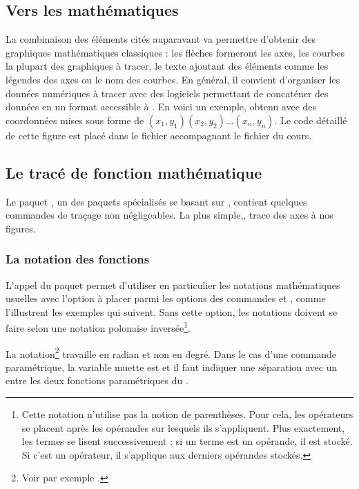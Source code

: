 \subsection{Vers les mathématiques}

La combinaison des éléments cités auparavant va permettre d'obtenir des graphiques mathématiques classiques : les flèches formeront les axes, les courbes la plupart des graphiques à tracer, le texte ajoutant des éléments comme les légendes des axes ou le nom des courbes. En général, il convient d'organiser les données numériques à tracer avec des logiciels permettant de concaténer des données en un format accessible à . En voici un exemple, obtenu avec des coordonnées mises sous forme de $(x_1,y_1)(x_2,y_2)\dots (x_n,y_n)$. 
Le code détaillé de cette figure est placé dans le fichier  accompagnant le fichier du cours.



\subsection{Le tracé de fonction mathématique}

Le paquet , un des paquets spécialisés se basant sur , contient quelques  commandes de traçage non négligeables. La plus simple,, trace des axes à nos figures.

\subsubsection{La notation des fonctions}

L'appel du paquet  permet d'utiliser en particulier les notations mathématiques usuelles avec l'option  à placer parmi les options des commandes  et , comme l'illustrent les exemples qui suivent. Sans cette option, les notations doivent se faire selon une notation polonaise inversée\footnote{Cette notation n'utilise pas la notion de parenthèses. Pour cela, les opérateurs se placent après les opérandes sur lesquels ils s'appliquent. Plus exactement, les termes se lisent successivement : si un terme est un opérande, il est stocké. Si c'est un opérateur, il s'applique aux derniers opérandes stockés.}.

La notation\footnote{Voir par exemple .} travaille en radian et non en degré. Dans le cas d'une  commande paramétrique, la variable muette est  et il faut indiquer une séparation avec un \macron{|} entre les deux fonctions paramétriques du .

